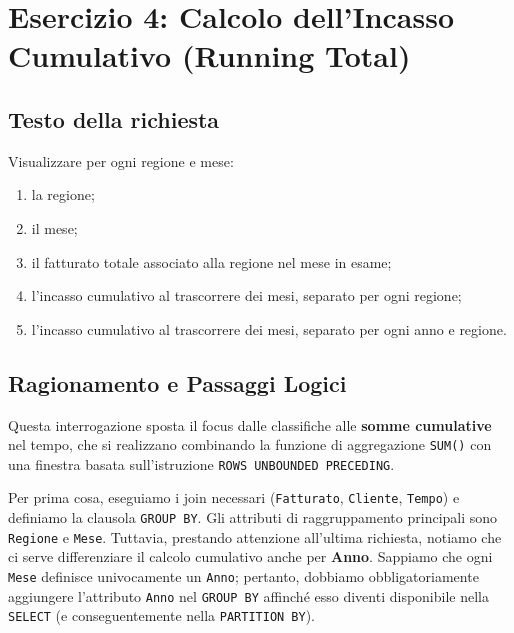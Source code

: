 \section{Esercizio 4: Calcolo dell'Incasso Cumulativo (Running Total)}

\subsection{Testo della richiesta}
Visualizzare per ogni regione e mese:
\begin{enumerate}
    \item la regione;
    \item il mese;
    \item il fatturato totale associato alla regione nel mese in esame;
    \item l'incasso cumulativo al trascorrere dei mesi, separato per ogni regione;
    \item l'incasso cumulativo al trascorrere dei mesi, separato per ogni anno e regione.
\end{enumerate}

\subsection{Ragionamento e Passaggi Logici}
Questa interrogazione sposta il focus dalle classifiche alle \textbf{somme cumulative} nel tempo, che si realizzano combinando la funzione di aggregazione \texttt{SUM()} con una finestra basata sull'istruzione \texttt{ROWS UNBOUNDED PRECEDING}.

Per prima cosa, eseguiamo i join necessari (\texttt{Fatturato}, \texttt{Cliente}, \texttt{Tempo}) e definiamo la clausola \texttt{GROUP BY}. Gli attributi di raggruppamento principali sono \texttt{Regione} e \texttt{Mese}. Tuttavia, prestando attenzione all'ultima richiesta, notiamo che ci serve differenziare il calcolo cumulativo anche per \textbf{Anno}. Sappiamo che ogni \texttt{Mese} definisce univocamente un \texttt{Anno}; pertanto, dobbiamo obbligatoriamente aggiungere l'attributo \texttt{Anno} nel \texttt{GROUP BY} affinché esso diventi disponibile nella \texttt{SELECT} (e conseguentemente nella \texttt{PARTITION BY}).

